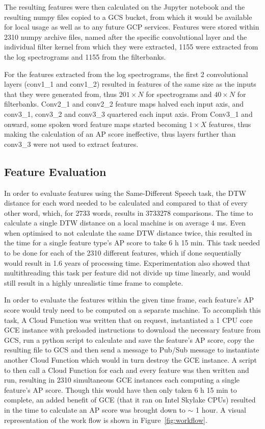 The resulting features were then calculated on the Jupyter notebook and the resulting numpy files copied to a GCS bucket, from which it would be available for local usage as well as to any future GCP services.
Features were stored within 2310 numpy archive files, named after the specific convolutional layer and the individual filter kernel from which they were extracted, 1155 were extracted from the log spectrograms and 1155 from the filterbanks. 

For the features extracted from the log spectrograms, the first 2 convolutional layers (conv1\_1 and conv1\_2) resulted in features of the same size as the inputs that they were generated from, thus $201 \times N$ for spectrograms and $40 \times N$ for filterbanks.
Conv2\_1 and conv2\_2 feature maps halved each input axis, and conv3\_1, conv3\_2 and conv3\_3 quartered each input axis.
From Conv3\_1 and onward, some spoken word feature maps started becoming $1\times X$ features, thus making the calculation of an AP score ineffective, thus layers further than conv3\_3 were not used to extract features.

\subsection{Feature Evaluation} \label{evaluation}

In order to evaluate features using the Same-Different Speech task, the DTW distance for each word needed to be calculated and compared to that of every other word, which, for 2733 words, results in 3733278 comparisons.
The time to calculate a single DTW distance on a local machine is on average 4 ms.
Even when optimised to not calculate the same DTW distance twice, this resulted in the time for a single feature type's AP score to take 6 h 15 min.
This task needed to be done for each of the 2310 different features, which if done sequentially would result in 1.6 years of processing time.
Experimentation also showed that multithreading this task per feature did not divide up time linearly, and would still result in a highly unrealistic time frame to complete.

In order to evaluate the features within the given time frame, each feature's AP score would truly need to be computed on a separate machine.
To accomplish this task, A Cloud Function was written that on request, instantiated a 1 CPU core GCE instance with preloaded instructions to download the necessary feature from GCS, run a python script to calculate and save the feature's AP score, copy the resulting file to GCS and then send a message to Pub/Sub message to instantiate another Cloud Function which would in turn destroy the GCE instance.
A script to then call a Cloud Function for each and every feature was then written and run, resulting in 2310 simultaneous GCE instances each computing a single feature's AP score.
Though this would have then only taken 6 h 15 min to complete, an added benefit of GCE (that it ran on Intel Skylake CPUs) resulted in the time to calculate an AP score was brought down to $\sim$ 1 hour.
A visual representation of the work flow is shown in Figure~\ref{fig:workflow}.

